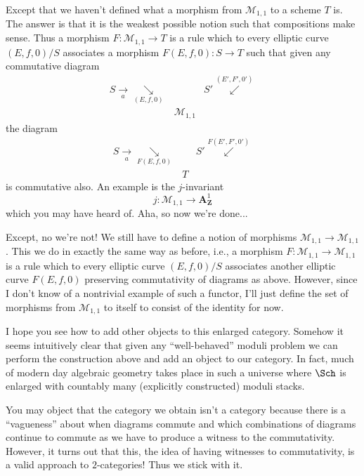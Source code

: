 \medskip\noindent
Except that we haven't defined what a morphism from $\mathcal{M}_{1, 1}$
to a scheme $T$ is. The answer is that it
is the weakest possible notion such that compositions make sense.
Thus a morphism $F : \mathcal{M}_{1, 1} \to T$
is a rule which to every elliptic curve $(E, f, 0)/S$ associates a morphism
$F(E, f, 0) : S \to T$ such that given any commutative diagram
$$
\begin{array}{ccc}S \underset{a}{\longrightarrow}\underset{(E, f, 0)}{\searrow} &  & S' \overset{(E', F', 0')}{\swarrow} \\  & \mathcal{M}_{1, 1} & \end{array}
$$
the diagram
$$
\begin{array}{ccc}S \underset{a}{\longrightarrow}\underset{F(E, f, 0)}{\searrow} &  & S' \overset{F(E', F', 0')}{\swarrow} \\  & T & \end{array}
$$
is commutative also. An example is the $j$-invariant
$$
j : \mathcal{M}_{1, 1} \longrightarrow \mathbf{A}^1_{\mathbf{Z}}
$$
which you may have heard of. Aha, so now we're done...

\medskip\noindent
Except, no we're not! We still have to define a notion of morphisms
$\mathcal{M}_{1, 1} \to \mathcal{M}_{1, 1}$. This we do in exactly the
same way as before, i.e., a morphism
$F : \mathcal{M}_{1, 1} \to \mathcal{M}_{1, 1}$
is a rule which to every elliptic curve $(E, f, 0)/S$ associates
another elliptic curve $F(E, f, 0)$ preserving commutativity of
diagrams as above. However, since I don't know of a nontrivial example
of such a functor, I'll just define the set of morphisms from
$\mathcal{M}_{1, 1}$ to itself to consist of the identity for now.

\medskip\noindent
I hope you see how to add other objects to this enlarged category.
Somehow it seems intuitively clear that given any ``well-behaved''
moduli problem we can perform the construction above and add an object
to our category. In fact, much of modern day algebraic geometry takes
place in such a universe where $\Sch$ is enlarged with countably many
(explicitly constructed) moduli stacks.

\medskip\noindent
You may object that the category we obtain isn't a category because
there is a ``vagueness'' about when diagrams commute and which combinations
of diagrams continue to commute as we have to produce a witness
to the commutativity. However, it turns out that this, the idea of having
witnesses to commutativity, is a valid approach to $2$-categories!
Thus we stick with it.

